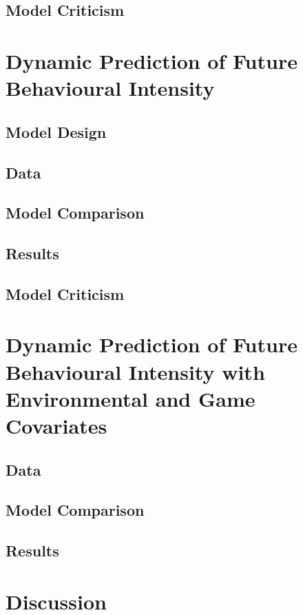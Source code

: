 \subsection{Model Criticism}
\lorem

\section{Dynamic Prediction of Future Behavioural Intensity}
\label{model_architecture_1}
\lorem

\subsection{Model Design}
\lorem

\subsection{Data}
\lorem

\subsection{Model Comparison}
\lorem

\subsection{Results}
\lorem

\subsection{Model Criticism}
\lorem

\section{Dynamic Prediction of Future Behavioural Intensity with Environmental and Game Covariates}
\label{model_architecture_1}
\lorem

\subsection{Data}
\lorem

\subsection{Model Comparison}
\lorem

\subsection{Results}
\lorem


\section{Discussion}
\lorem